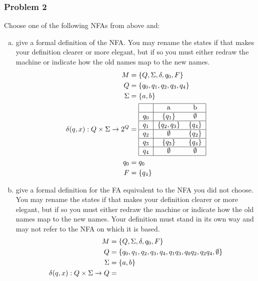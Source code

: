 \documentclass{math}
\begin{document}
\subsubsection*{Problem 2}
Choose one of the following NFAs from above and:
\begin{enumerate}[(a)]
  \item give a formal definition of the NFA. You may rename the states if that
  makes your definition clearer or more elegant, but if so you must either
  redraw the machine or indicate how the old names map to the new names.
  \begin{align*}
    M &= \{Q,\Sigma,\delta,q_0,F\} \\
    Q &= \{q_0,q_1,q_2,q_3,q_4\} \\
    \Sigma &= \{a,b\} \\
    \delta(q,x):Q\times\Sigma\to2^{Q} &= \begin{tabular}{|c|cc|}
      \hline
          & a                 & b               \\ \hline
      \( q_0 \) & \( \{q_1\}     \) & \( \emptyset \) \\ \hline
      \( q_1 \) & \( \{q_2,q_3\} \) & \( \{q_4\}   \) \\ \hline
      \( q_2 \) & \( \emptyset   \) & \( \{q_2\}   \) \\ \hline
      \( q_3 \) & \( \{q_3\}     \) & \( \{q_4\}   \) \\ \hline
      \( q_4 \) & \( \emptyset   \) & \( \emptyset \) \\ \hline
    \end{tabular} \\
    q_0 &= q_0 \\
    F &= \{q_4\}
  \end{align*}
  \item give a formal definition for the FA equivalent to the NFA you did not
  choose. You may rename the states if that makes your definition clearer or
  more elegant, but if so you must either redraw the machine or indicate how
  the old names map to the new names. Your definition must stand in its own way
  and may not refer to the NFA on which it is based.
  \begin{align*}
    M &= \{Q,\Sigma,\delta,q_0,F\} \\
    Q &= \{q_0,q_1,q_2,q_3,q_4,q_1q_3,q_0q_2,q_2q_4,\emptyset\} \\
    \Sigma &= \{a,b\} \\
    \delta(q,x):Q\times\Sigma\to Q &= \begin{tabular}{|c|cc|}

\end{tabular}
\end{align*}
\end{enumerate}
\end{document}
